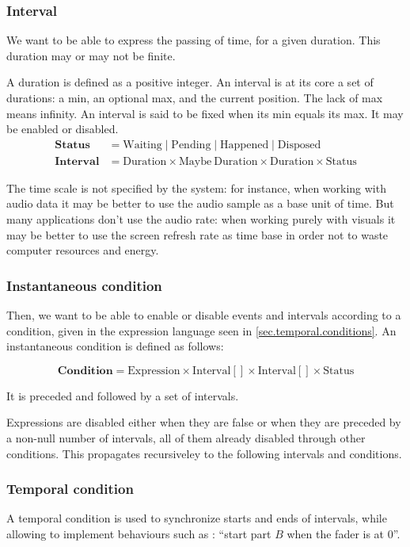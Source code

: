 \documentclass[applsci,article,submit,moreauthors,pdftex,10pt,a4paper]{mdpi}
\begin{document}
\subsubsection{Interval}
We want to be able to express the passing of time, for a given duration.
This duration may or may not be finite.

A duration is defined as a positive integer.
An interval is at its core a set of durations: a min, an optional max, and the current position. 
The lack of max means infinity.
An interval is said to be fixed when its min equals its max. It may be enabled or disabled.
\begin{align*}
\mathbf{Status} &= \mathrm{Waiting} \mid \mathrm{Pending} \mid \mathrm{Happened} \mid \mathrm{Disposed} \\
\mathbf{Interval} &= \mathrm{Duration} \times \mathrm{Maybe} ~\mathrm{Duration} \times \mathrm{Duration} \times \mathrm{Status}
\end{align*}

The time scale is not specified by the system: for instance, when working with audio data it may be better to use the audio sample as a base unit of time.
But many applications don't use the audio rate: when working purely with visuals it may be better to use the screen refresh rate as time base in order not to 
waste computer resources and energy. 

\subsubsection{Instantaneous condition}
Then, we want to be able to enable or disable events and intervals according to a condition, given in the expression language seen in \ref{sec.temporal.conditions}. An instantaneous condition is defined as follows: 

\[
\mathbf{Condition} = \mathrm{Expression} \times \mathrm{Interval}[] \times \mathrm{Interval}[] \times \mathrm{Status}
\]

It is preceded and followed by a set of intervals.

Expressions are disabled either when they are false or when they are preceded by a non-null number of intervals, all of them already disabled through other conditions. This propagates recursiveley to the following intervals and conditions. 

\subsubsection{Temporal condition}
A temporal condition is used to synchronize starts and ends of intervals, while allowing to implement behaviours such as : ``start part $B$ when the fader is at 0''.
\end{document}
